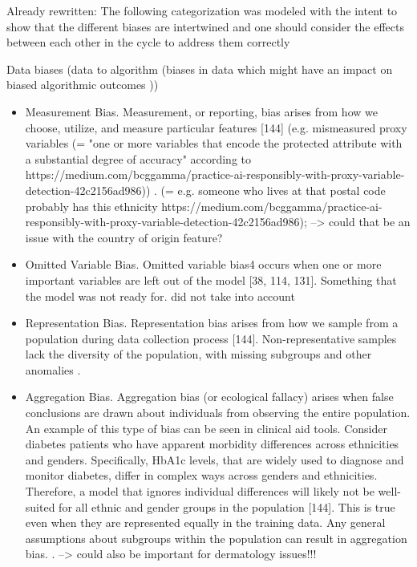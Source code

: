 \documentclass[12pt, a4paper, oneside]{book}   	%
\begin{document}
			Already rewritten: The following categorization was modeled with the intent to show that the different biases are intertwined and one should consider the effects between each other in the cycle to address them correctly \autocite{Mehrabi_2021}
			
			Data biases (data to algorithm (biases in data which might have an impact on biased algorithmic outcomes \autocite{Mehrabi_2021}))
			\begin{itemize}
				\item Measurement Bias. Measurement, or reporting, bias arises from how we choose, utilize, and measure particular features [144] (e.g. mismeasured proxy variables (= "one or more variables that encode the protected attribute with a substantial degree of accuracy" according to https://medium.com/bcggamma/practice-ai-responsibly-with-proxy-variable-detection-42c2156ad986)) \autocite{Mehrabi_2021}. (= e.g. someone who lives at that postal code probably has this ethnicity https://medium.com/bcggamma/practice-ai-responsibly-with-proxy-variable-detection-42c2156ad986); --> could that be an issue with the country of origin feature?
				\item Omitted Variable Bias. Omitted variable bias4 occurs when one or more important variables are left out of the model [38, 114, 131]. Something that the model was not ready for\autocite{Mehrabi_2021}. did not take into account
				\item Representation Bias. Representation bias arises from how we sample from a population during data collection process [144]. Non-representative samples lack the diversity of the population, with missing subgroups and other anomalies \autocite{Mehrabi_2021}.
				\item Aggregation Bias. Aggregation bias (or ecological fallacy) arises when false conclusions are drawn about individuals from observing the entire population. An example of this type of bias can be seen in clinical aid tools. Consider diabetes patients who have apparent morbidity differences across ethnicities and genders. Specifically, HbA1c levels, that are widely used to diagnose and monitor diabetes, differ in complex ways across genders and ethnicities. Therefore, a model that ignores individual differences will likely not be well-suited for all ethnic and gender groups in the population [144]. This is true even when they are represented equally in the training data. Any general assumptions about subgroups within the population can result in aggregation bias. \autocite{Mehrabi_2021}. --> could also be important for dermatology issues!!!

\end{itemize}
\end{document}
